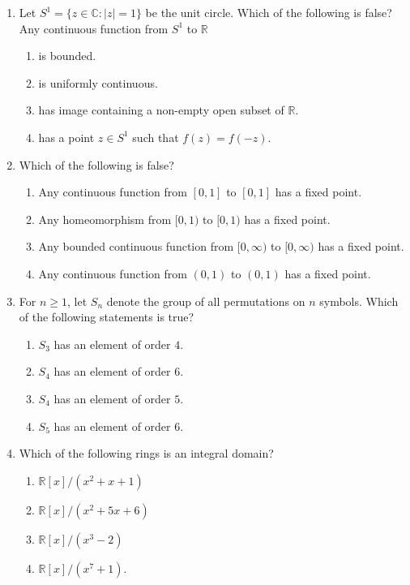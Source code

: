\documentclass[11pt, a4paper]{article}
\begin{document}
\begin{enumerate}[resume]
  \item Let $S^1 = \{z \in \mathbb{C} : |z| = 1\}$ be the unit circle. Which of the following is false? Any continuous function from $S^1$ to $\mathbb{R}$
  \begin{enumerate}[label=\Alph*.]
    \item is bounded.
    \item is uniformly continuous.
    \item has image containing a non-empty open subset of $\mathbb{R}$.
    \item has a point $z \in S^1$ such that $f(z) = f(-z)$.
  \end{enumerate}

  \item Which of the following is false?
  \begin{enumerate}[label=\Alph*.]
    \item Any continuous function from $[0, 1]$ to $[0, 1]$ has a fixed point.
    \item Any homeomorphism from $[0, 1)$ to $[0, 1)$ has a fixed point.
    \item Any bounded continuous function from $[0, \infty)$ to $[0, \infty)$ has a fixed point.
    \item Any continuous function from $(0, 1)$ to $(0, 1)$ has a fixed point.
  \end{enumerate}

  \item For $n \ge 1$, let $S_n$ denote the group of all permutations on $n$ symbols. Which of the following statements is true?
  \begin{enumerate}[label=\Alph*.]
    \item $S_3$ has an element of order $4$.
    \item $S_4$ has an element of order $6$.
    \item $S_4$ has an element of order $5$.
    \item $S_5$ has an element of order $6$.
  \end{enumerate}

  \item Which of the following rings is an integral domain?
  \begin{enumerate}[label=\Alph*.]
    \item $\mathbb{R}[x]/(x^2 + x + 1)$
    \item $\mathbb{R}[x]/(x^2 + 5x + 6)$
    \item $\mathbb{R}[x]/(x^3 - 2)$
    \item $\mathbb{R}[x]/(x^7 + 1)$.
  \end{enumerate}


\end{enumerate}
\end{document}
